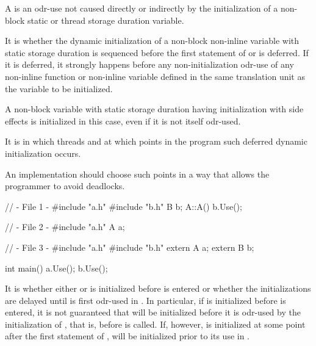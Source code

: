 \pnum
{}%
A 
is an odr-use not caused directly or indirectly by
the initialization of a non-block static or thread storage duration variable.

\pnum
{}%
It is 
whether the dynamic initialization of a
non-block non-inline variable with static storage duration
is sequenced before the first statement of  or is deferred.
If it is deferred, it strongly happens before
any non-initialization odr-use
of any non-inline function or non-inline variable
defined in the same translation unit as the variable to be initialized.
\begin{footnote}
A non-block variable with static storage duration
having initialization
with side effects is initialized in this case,
even if it is not itself odr-used.
\end{footnote}
It is 
in which threads and at which points in the program such deferred dynamic initialization occurs.

\recommended
An implementation should choose such points in a way
that allows the programmer to avoid deadlocks.
\begin{example}
\begin{codeblock}
// - File 1 -
#include "a.h"
#include "b.h"
B b;
A::A() {
  b.Use();
}

// - File 2 -
#include "a.h"
A a;

// - File 3 -
#include "a.h"
#include "b.h"
extern A a;
extern B b;

int main() {
  a.Use();
  b.Use();
}
\end{codeblock}

It is 
whether either  or  is
initialized before  is entered or whether the
initializations are delayed until  is first odr-used in
. In particular, if  is initialized before
 is entered, it is not guaranteed that  will be
initialized before it is odr-used by the initialization of , that
is, before  is called. If, however,  is initialized
at some point after the first statement of ,  will
be initialized prior to its use in .
\end{example}

